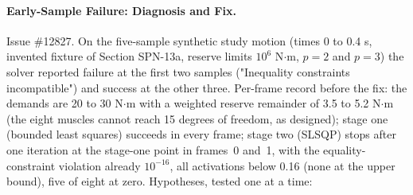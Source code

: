 \paragraph{Early-Sample Failure: Diagnosis and Fix.}
Issue \#12827. On the five-sample synthetic study motion (times 0 to 0.4 s,
invented fixture of Section SPN-13a, reserve limits $10^{6}$ N$\cdot$m, $p=2$
and $p=3$) the solver reported failure at the first two samples ("Inequality
constraints incompatible") and success at the other three. Per-frame record
before the fix: the demands are 20 to 30 N$\cdot$m with a weighted reserve
remainder of 3.5 to 5.2 N$\cdot$m (the eight muscles cannot reach 15
degrees of freedom, as designed); stage one (bounded least squares) succeeds in
every frame; stage two (SLSQP) stops after one iteration at the stage-one point
in frames~0 and~1, with the equality-constraint violation already $10^{-16}$,
all activations below 0.16 (none at the upper bound), five of eight at zero.
Hypotheses, tested one at a time:
